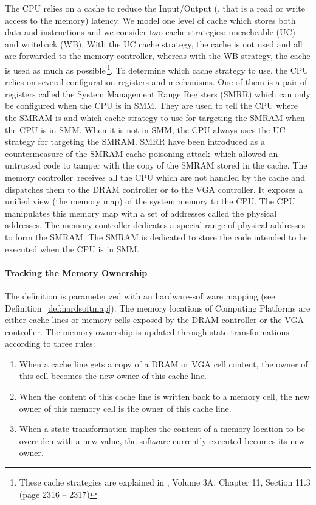 The CPU relies on a cache to reduce the Input/Output (\IO, that is a read or
write access to the memory) latency. We model one level of cache which stores
both data and instructions and we consider two cache strategies: uncacheable
(UC) and writeback (WB). With the UC cache strategy, the cache is not used and
all \IOs are forwarded to the memory controller, whereas with the WB strategy,
the cache is used as much as possible\,\footnote{These cache strategies are
  explained in \cite{intel2014manual}, Volume 3A, Chapter 11, Section 11.3 (page
  2316 -- 2317)}. To determine which cache strategy to use, the CPU relies on
several configuration registers and mechanisms. One of them is a pair of
registers called the System Management Range Registers (SMRR) which can only be
configured when the CPU is in SMM. They are used to tell the CPU where the SMRAM
is and which cache strategy to use for \IO targeting the SMRAM when the CPU is
in SMM.  When it is not in SMM, the CPU always uses the UC strategy for \IO
targeting the SMRAM. SMRR have been introduced as a countermeasure of the SMRAM
cache poisoning attack\,\cite{wojtczuk2009smram,duflot2009smram} which allowed
an untrusted code to tamper with the copy of the SMRAM stored in the cache.  The
memory controller\,\cite{intel2009mch} receives all the CPU \IOs which are not
handled by the cache and dispatches them to the DRAM controller or to the VGA
controller. It exposes a unified view (the memory map) of the system memory to
the CPU. The CPU manipulates this memory map with a set of addresses called the
physical addresses. The memory controller dedicates a special range of physical
addresses to form the SMRAM. The SMRAM is dedicated to store the code intended
to be executed when the CPU is in SMM.

\paragraph{Tracking the Memory Ownership} The  definition is
parameterized with an hardware-software mapping (see
Definition~\ref{def:hardsoftmap}). The memory locations of 
Computing Platforms are either cache lines or memory cells exposed by the DRAM
controller or the VGA controller. The memory ownership is updated through
state-transformations according to three rules:
\begin{enumerate}
\item When a cache line gets a copy of a DRAM or VGA cell content, the owner of
  this cell becomes the new owner of this cache line.
\item When the content of this cache line is written back to a memory cell, the
  new owner of this memory cell is the owner of this cache line.
\item When a state-transformation implies the content of a memory location to be
  overriden with a new value, the software currently executed becomes its new
  owner.
\end{enumerate}

